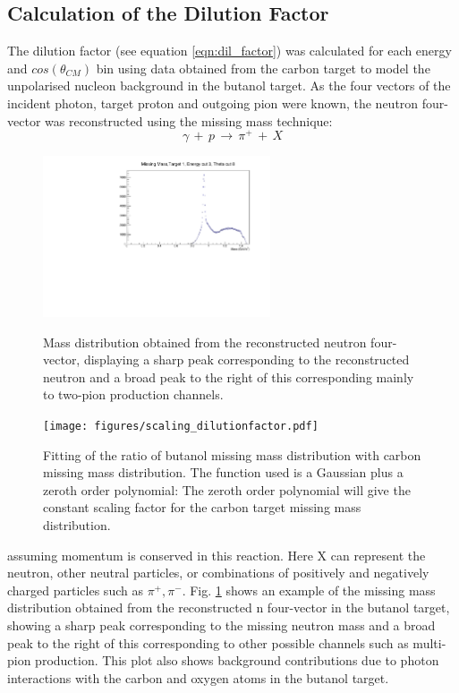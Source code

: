 \subsection{Calculation of the Dilution Factor}
\label{ch:dil_factor}
The dilution factor (see equation \ref{eqn:dil_factor}) was calculated for each energy and $cos(\theta_{CM})$ bin using data obtained from the carbon target to model the unpolarised nucleon background in the butanol target.
As the four vectors of the incident photon, target proton and outgoing pion were known, the neutron four-vector was reconstructed using the missing mass technique:
$$
\gamma \, + \,  p \, \rightarrow \, \pi^+ \, + \, X
$$
\begin{figure}[htb]
  \begin{center}
    \includegraphics[width=0.6\textwidth]{figures/neutron_missingmass.pdf} \\
    \caption{Mass distribution obtained from the reconstructed neutron four-vector, displaying a sharp peak corresponding to the reconstructed neutron and
a broad peak to the right of this corresponding mainly to two-pion production channels. }
    \label{fig:frost_neutronmissing_ex}
  \end{center}
\end{figure}
\begin{figure}[htb]
  \begin{center}
    \texttt{[image: figures/scaling\_dilutionfactor.pdf]} \\
    \caption{Fitting of the ratio of butanol missing mass distribution with carbon missing mass distribution. The function used is a Gaussian plus a zeroth order polynomial: The zeroth order polynomial will give the constant scaling factor for the carbon target missing mass distribution. }
    \label{fig:scaling_dilutionfactor}
  \end{center}
\end{figure}
assuming momentum is conserved in this reaction. Here X can represent the neutron, other neutral particles, or combinations of positively and negatively charged particles such as $\pi^+ , \pi^-$. Fig. \ref{fig:frost_neutronmissing_ex} shows an example of the missing mass distribution obtained from the reconstructed n four-vector in the butanol target, showing a sharp peak corresponding to the missing neutron mass and a broad peak to the right of this corresponding to other possible channels such as multi-pion production. This plot also shows background contributions due to photon interactions with the carbon and oxygen atoms in the butanol target.
